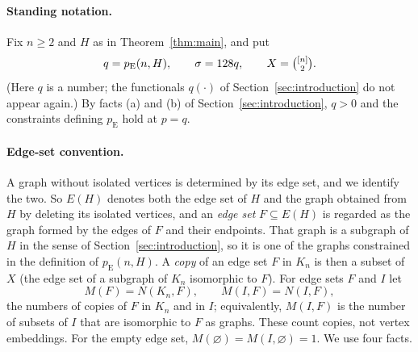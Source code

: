 \documentclass[11pt]{article}
\numberwithin{equation}{section}
\newcommand{\pE}{p_{\mathrm E}}
\begin{document}
\paragraph{Standing notation.}
Fix $n\ge2$ and $H$ as in Theorem~\ref{thm:main}, and put
\[
 q=\pE(n,H),\qquad\sigma=128q,\qquad X=\tbinom{[n]}2 .
\]
(Here $q$ is a number; the functionals $q(\cdot)$ of
Section~\ref{sec:introduction} do not appear again.) By facts (a) and
(b) of Section~\ref{sec:introduction}, $q>0$ and the constraints
defining $\pE$ hold at $p=q$.

\paragraph{Edge-set convention.}
A graph without isolated vertices is determined by its edge set, and we
identify the two. So $E(H)$ denotes both the edge set of $H$ and the
graph obtained from $H$ by deleting its isolated vertices, and an
\emph{edge set} $F\subseteq E(H)$ is regarded as the graph formed by
the edges of $F$ and their endpoints. That graph is a subgraph of $H$
in the sense of Section~\ref{sec:introduction}, so it is one of the
graphs constrained in the definition of $\pE(n,H)$. A \emph{copy} of an
edge set $F$ in $K_n$ is then a subset of $X$ (the edge set of a
subgraph of $K_n$ isomorphic to $F$). For edge sets $F$ and $I$ let
\[
 M(F)=N(K_n,F),\qquad M(I,F)=N(I,F),
\]
the numbers of copies of $F$ in $K_n$ and in $I$; equivalently,
$M(I,F)$ is the number of subsets of $I$ that are isomorphic to $F$ as
graphs. These count copies, not vertex embeddings. For the empty edge
set, $M(\varnothing)=M(I,\varnothing)=1$. We use four facts.
\end{document}

